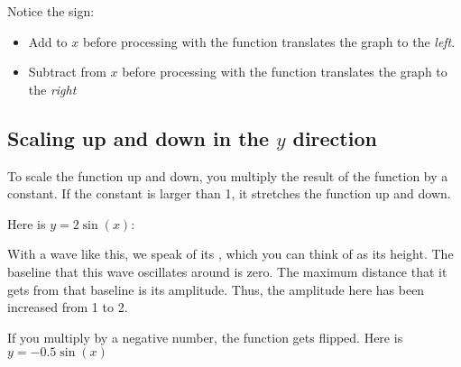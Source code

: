 Notice the sign:
\begin{itemize}
\item Add to $x$ before processing with the function translates the graph to the \emph{left}.
\item Subtract from $x$ before processing with the function translates the graph to the \emph{right}
\end{itemize}

\subsection{Scaling up and down in the $y$ direction}

To scale the function up and down, you multiply the result of the
function by a constant.  If the constant is larger than 1, it
stretches the function up and down.

Here is $y = 2\sin(x)$:


With a wave like this, we speak of its , which you
can think of as its height. The baseline that this wave oscillates
around is zero. The maximum distance that it gets from that baseline
is its amplitude.  Thus, the amplitude here has been increased from 1
to 2.

If you multiply by a negative number, the function gets flipped.  Here is $y = -0.5 \sin(x)$

